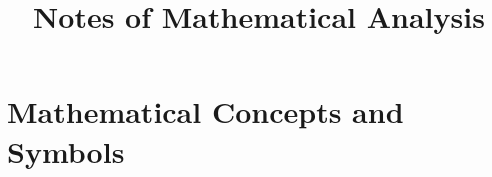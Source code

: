 \documentclass[11pt,oneside]{book}
\title{Notes of Mathematical Analysis}
\author{}
\date{}
\begin{document}
\newtheorem*{tips}{\emph{TIPS}}
\chapter{Mathematical Concepts and Symbols}


\end{document}
